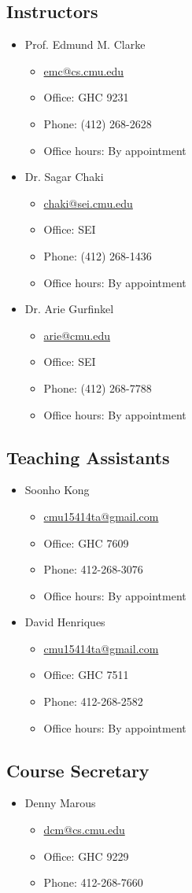 \documentclass{article}
\begin{document}
\subsection{Instructors}
\begin{itemize}
\item Prof. Edmund M. Clarke
  \begin{itemize}
  \item \url{emc@cs.cmu.edu}
  \item Office: GHC 9231 
  \item Phone: (412) 268-2628 
  \item Office hours: By appointment
  \end{itemize}
\item Dr. Sagar Chaki 
  \begin{itemize}
  \item \url{chaki@sei.cmu.edu}
  \item Office: SEI 
  \item Phone: (412) 268-1436 
  \item Office hours: By appointment
  \end{itemize}
\item Dr. Arie Gurfinkel 
  \begin{itemize}
  \item \url{arie@cmu.edu}
  \item Office: SEI 
  \item Phone: (412) 268-7788 
  \item Office hours: By appointment
  \end{itemize}
\end{itemize}

\subsection{Teaching Assistants}
\begin{itemize}
\item Soonho Kong
  \begin{itemize}
  \item \url{cmu15414ta@gmail.com}
  \item Office: GHC 7609 
  \item Phone: 412-268-3076 
  \item Office hours: By appointment
  \end{itemize}
\item David Henriques 
  \begin{itemize}
  \item \url{cmu15414ta@gmail.com}
  \item Office: GHC 7511 
  \item Phone: 412-268-2582 
  \item Office hours: By appointment	
  \end{itemize}
\end{itemize}

\subsection{Course Secretary}
\begin{itemize}
\item Denny Marous 
  \begin{itemize}
  \item \url{dcm@cs.cmu.edu}
  \item Office: GHC 9229 
  \item Phone: 412-268-7660
  \end{itemize}
\end{itemize}
\end{document}

